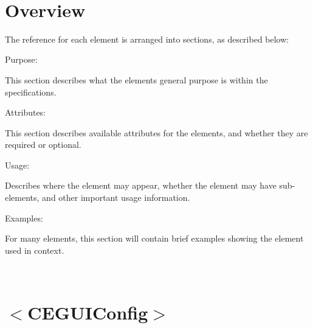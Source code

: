 ~\newline
 \hypertarget{xml_config_xml_config_overview}{}\section{Overview}\label{xml_config_xml_config_overview}
The reference for each element is arranged into sections, as described below\+:
\begin{DoxyItemize}
\item Purpose\+:
\begin{DoxyItemize}
\item This section describes what the elements general purpose is within the specifications.
\end{DoxyItemize}
\item Attributes\+:
\begin{DoxyItemize}
\item This section describes available attributes for the elements, and whether they are required or optional.
\end{DoxyItemize}
\item Usage\+:
\begin{DoxyItemize}
\item Describes where the element may appear, whether the element may have sub-\/elements, and other important usage information.
\end{DoxyItemize}
\item Examples\+:
\begin{DoxyItemize}
\item For many elements, this section will contain brief examples showing the element used in context.
\end{DoxyItemize}
\end{DoxyItemize}

~\newline
 \hypertarget{xml_config_xml_config_ceguiconfig}{}\section{$<$\+C\+E\+G\+U\+I\+Config$>$}\label{xml_config_xml_config_ceguiconfig}

